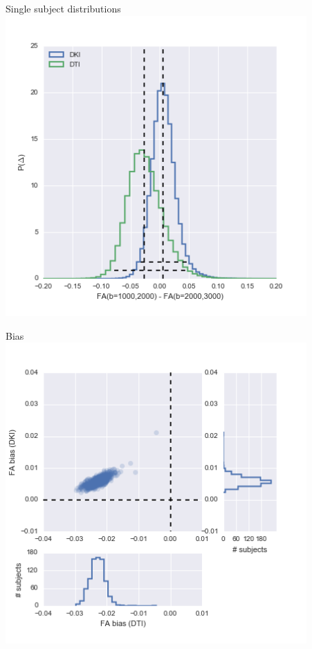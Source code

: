 \documentclass[a0, landscape]{a0poster}
\begin{document}
\begin{multicols}{3}
\begin{minipage}[b]{1\linewidth}
  \begin{minipage}[b]{0.33\linewidth}
  \center Single subject distributions\\
  \includegraphics[width=11.5cm]{reliability_singleton_fa.png}
  \end{minipage}
  \begin{minipage}[b]{0.33\linewidth}
    \center Bias\\
    \includegraphics[width=11.5cm]{fa_bias.png}

\end{minipage}
\end{minipage}
\end{multicols}
\end{document}
